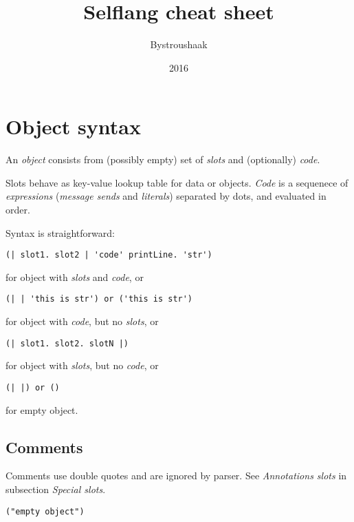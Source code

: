 \documentclass[10pt]{article}
\title{Selflang cheat sheet}
\author{Bystroushaak}
\date{2016}
\renewcommand{\maketitle}{
    {\begin{center}\Large \mythetitle\end{center}}
}
\begin{document}
\begin{multicols*}{3}
\maketitle

\section{Object syntax}
An \textit{object} consists from (possibly empty) set of \textit{slots} and (optionally) \textit{code}.

Slots behave as key-value lookup table for data or objects. \textit{Code} is a sequenece of \textit{expressions} (\textit{message sends} and \textit{literals}) separated by dots, and evaluated in order.

Syntax is straightforward:

\begin{lstlisting}
(| slot1. slot2 | 'code' printLine. 'str')
\end{lstlisting}

for object with \textit{slots} and \textit{code}, or

\begin{lstlisting}
(| | 'this is str') or ('this is str')
\end{lstlisting}

for object with \textit{code}, but no \textit{slots}, or

\begin{lstlisting}
(| slot1. slot2. slotN |)
\end{lstlisting}

for object with \textit{slots}, but no \textit{code}, or

\begin{lstlisting}
(| |) or ()
\end{lstlisting}

for empty object.



\subsection{Comments}
Comments use double quotes and are ignored by parser. See \textit{Annotations slots} in subsection \textit{Special slots}.

\begin{lstlisting}
("empty object")
\end{lstlisting}





\end{multicols*}
\end{document}
